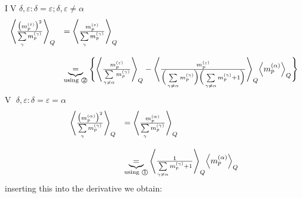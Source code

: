 \textcircled{IV} $\delta, \varepsilon: \delta = \varepsilon; \delta, \varepsilon \neq \alpha$
\begin{equation}
	\begin{array}{ll}
		\Bigg< \frac{\big( m_p^{(\varepsilon)} \big)^2 }{
				\sum\limits_\gamma m_p^{(\gamma)}} \Bigg>_Q
		& = \Bigg< \frac{m_p^{(\varepsilon)} }{
				\sum\limits_\gamma m_p^{(\gamma)}} \Bigg>_Q \\\\
		& \underbrace{=}_{\text{using \textcircled{2}}}
			\Bigg\{ \Bigg< \frac{m_p^{(\varepsilon)} }{
				\sum\limits_{\gamma \neq \alpha}
				m_p^{(\gamma)}} \Bigg>_Q
			- \Bigg< \frac{m_p^{(\varepsilon)}}{
		\Big(\sum\limits_{\gamma \neq \alpha} m_p^{(\gamma)} \Big)
		\Big(\sum\limits_{\gamma \neq \alpha} m_p^{(\gamma)} + 1 \Big)}
		\Bigg>_Q \Big< m_p^{(\alpha)} \Big>_Q
			\Bigg\}
	\end{array}
\end{equation}
\textcircled{V} $\delta, \varepsilon: \delta = \varepsilon = \alpha$
\begin{equation}
	\begin{array}{ll}
	\Bigg< \frac{\big( m_p^{(\alpha)} \big)^2 }{
				\sum\limits_\gamma m_p^{(\gamma)}} \Bigg>_Q
		& = \Bigg< \frac{m_p^{(\alpha)} }{
				\sum\limits_\gamma m_p^{(\gamma)}} \Bigg>_Q \\\\
		& \underbrace{=}_{\text{using \textcircled{1}}}
			\Bigg< \frac{1}{\sum\limits_{\gamma \neq \alpha} 
				m_p^{(\gamma)} + 1}
			\Bigg>_Q \Big< m_p^{(\alpha)} \Big>_Q
	\end{array}
\end{equation}
inserting this into the derivative we obtain:
